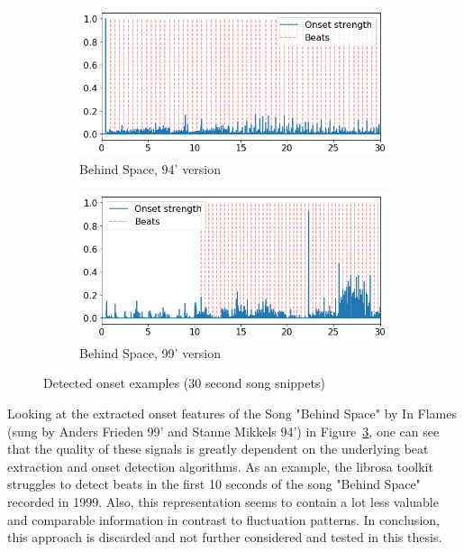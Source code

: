 \begin{figure}[htbp]
{{			\begin{subfigure}{.495\textwidth}
				\centering    
				\includegraphics[scale=0.3]{Images/Beat/s_s_on.png}
				\caption{Behind Space, 94' version}
				\label{saon}
			\end{subfigure}		
			\begin{subfigure}{.495\textwidth}
				\centering     
				\includegraphics[scale=0.3]{Images/Beat/s_a_on.png}
				\caption{Behind Space, 99' version}
				\label{sson}
			\end{subfigure}%
				
	}}
	\caption{Detected onset examples (30 second song snippets)}
	\label{fig:ons1}
\end{figure}	

\noindent Looking at the extracted onset features of the Song "Behind Space" by In Flames (sung by Anders Frieden 99' and Stanne Mikkels 94') in Figure~\ref{fig:ons1}, one can see that the quality of these signals is greatly dependent on the underlying beat extraction and onset detection algorithms. As an example, the librosa toolkit struggles to detect beats in the first 10 seconds of the song "Behind Space" recorded in 1999. Also, this representation seems to contain a lot less valuable and comparable information in contrast to fluctuation patterns. In conclusion, this approach is discarded and not further considered and tested in this thesis.  

